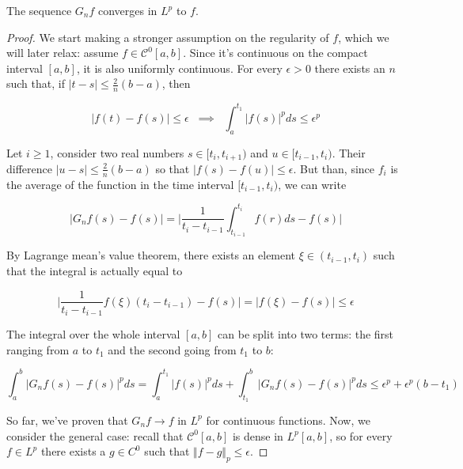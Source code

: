 \begin{lemma}
    The sequence $G_n f$ converges in $L^p$ to $f$. 
\end{lemma}
\begin{proof}
     We start making a stronger assumption on the regularity of $f$, which we will later relax: assume $f \in \mathcal{C}^0[a,b]$. Since it's continuous on the compact interval $[a,b]$, it is also uniformly continuous. For every $\epsilon > 0$ there exists an $n$ such that, if $\vert t - s \vert \leq \frac{2}{n}(b-a)$, then 

     \begin{equation*}
         \big\vert f(t) - f(s) \big\vert \leq \epsilon \;\; \implies \;\; \int_a^{t_1} \vert f(s) \vert^p ds \leq \epsilon^p
     \end{equation*}

     Let $i \geq 1$, consider two real numbers $s \in [t_i,t_{i+1})$ and $u \in [t_{i-1},t_i)$. Their difference $\vert u - s\vert \leq \frac{2}{n}(b-a)$ so that $\vert f(s) - f(u) \vert \leq \epsilon$. But than, since $f_{i}$ is the average of the function in the time interval $[t_{i-1},t_i)$, we can write

     \begin{equation*}
         \vert G_n f(s) - f(s) \vert = \Bigg\vert \frac{1}{t_i-t_{i-1}} \int_{t_{i-1}}^{t_i} f(r) ds - f(s) \Bigg\vert
     \end{equation*}

     By Lagrange mean's value theorem, there exists an element $\xi \in (t_{i-1},t_i)$ such that the integral is actually equal to

     \begin{equation*}
         \Big\vert \frac{1}{t_{i}-t_{i-1}} f(\xi) (t_i - t_{i-1}) - f(s) \Big\vert = \vert f(\xi) - f(s) \vert \leq \epsilon
    \end{equation*}

The integral over the whole interval $[a,b]$ can be split into two terms: the first ranging from $a$ to $t_1$ and the second going from $t_1$ to $b$: 


\begin{equation*}
    \int_a^b \Big\vert G_n f(s) - f(s) \Big\vert^p ds = \int_a^{t_1} \vert f(s) \vert^p ds + \int_{t_1}^b \vert G_n f(s) - f(s) \vert^p ds \leq \epsilon^p+\epsilon^p(b-t_1)
\end{equation*}

So far, we've proven that $G_n f \to f$ in $L^p$ for continuous functions. Now, we consider the general case: recall that $\mathcal{C}^0[a,b]$ is dense in $L^p[a,b]$, so for every $f \in L^p$ there exists a $g \in C^0$ such that $\Vert f - g \Vert_p \leq \epsilon$. 


\end{proof}

